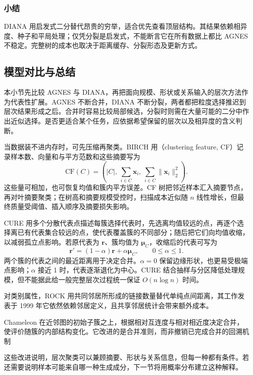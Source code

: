 \subsubsection{小结}

DIANA 用启发式二分替代昂贵的穷举，适合优先查看顶层结构。其结果依赖相异度、种子和平局处理；仅凭分裂是启发式，不能断言它在所有数据上都比 AGNES 不稳定。完整树的成本也取决于距离缓存、分裂形态及更新方式。

\subsection{模型对比与总结}

本小节先比较 AGNES 与 DIANA，再把面向规模、形状或关系输入的层次方法作为代表性扩展。AGNES 不断合并，DIANA 不断分裂，两者都把粒度选择推迟到层次结果形成之后。合并时容易比较局部候选，分裂时则需在大量可能的二分中作出近似选择。是否更适合某个任务，应依据希望保留的层次以及相异度的含义判断。

当数据装不进内存时，可先压缩再聚类。BIRCH 用（clustering feature, CF）记录样本数、向量和与平方范数和这些摘要写为
\[
 \mathrm{CF}(C)=
 \left(|C|,\ \sum_{i\in C}\bm{x}_i,\
 \sum_{i\in C}\lVert\bm{x}_i\rVert_2^2\right).
\]
这些量可相加，也可恢复均值和簇内平方误差。CF 树把邻近样本汇入摘要节点，再对叶摘要聚类；在树高和摘要规模受控时，扫描成本近似随 $n$ 线性增长，但最终质量受阈值、插入顺序及摘要损失影响。

CURE 用多个分散代表点描述每簇选择代表时，先选离均值较远的点，再逐个选择离已有代表集合较远的点，使代表覆盖簇的不同部分；随后把它们向均值收缩，以减弱孤立点影响。若原代表为 $\bm{r}$、簇均值为 $\bm{\mu}_C$，收缩后的代表可写为
\[
 \bm{r}'=(1-\alpha)\bm{r}+\alpha\bm{\mu}_C,
 \qquad 0\leq\alpha\leq1.
\]
两个簇的代表之间的最近距离用于决定合并。$\alpha=0$ 保留边缘形状，也更易受极端点影响；$\alpha$ 接近 1 时，代表逐渐退化为中心。CURE 结合抽样与分区降低处理规模，但不能据此给一般完整层次过程统一保证 $O(n\log n)$ 时间。

对类别属性，ROCK 用共同邻居所形成的链接数量替代单纯点间距离，其工作发表于 1999 年它依然依赖邻居定义，且共享邻居统计会带来额外成本。

\Needspace{55mm}
Chameleon 在近邻图的初始子簇之上，根据相对互连度与相对相近度决定合并，使评价随簇的内部结构变化。它改进的是合并准则，而非撤销已完成合并的回溯机制

这些改进说明，层次聚类可以兼顾摘要、形状与关系信息，但每一种都有条件。若还需要说明样本可能来自哪一种生成成分，下一节将用概率分布建立这种解释。

